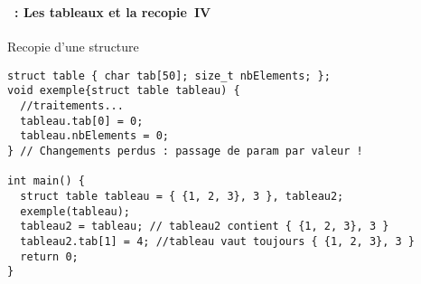 \begin{frame}[containsverbatim]
  \frametitle{\secname}
  \framesubtitle{\subsecname~: Les tableaux et la recopie~IV}

  {\small\begin{exampleblock}{Recopie d'une structure}
    \begin{verbatim}
struct table { char tab[50]; size_t nbElements; };
void exemple{struct table tableau) {
  //traitements...
  tableau.tab[0] = 0;
  tableau.nbElements = 0;
} // Changements perdus : passage de param par valeur ! 

int main() {
  struct table tableau = { {1, 2, 3}, 3 }, tableau2;
  exemple(tableau);
  tableau2 = tableau; // tableau2 contient { {1, 2, 3}, 3 }
  tableau2.tab[1] = 4; //tableau vaut toujours { {1, 2, 3}, 3 }
  return 0;
}\end{verbatim}
  \end{exampleblock}}
\end{frame}

